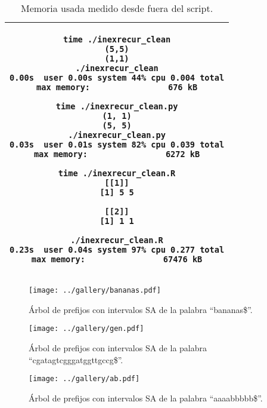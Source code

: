 \documentclass{article}
\newcommand{\tempcaption}{}
\newenvironment{codesnip}[1]
{
\begin{table}[h!]
\gdef\tempcaption{#1}
\centering
\begin{tabular}{|c|}
\hline
}
{
\\\hline
\end{tabular}
\caption{\tempcaption}
\end{table}
}
\begin{document}
\vfill
\begin{codesnip}{Memoria usada medido desde fuera del script.}
\begin{lstlisting}
time ./inexrecur_clean
(5,5)
(1,1)
./inexrecur_clean
0.00s  user 0.00s system 44% cpu 0.004 total
max memory:                676 kB

time ./inexrecur_clean.py
(1, 1)
(5, 5)
./inexrecur_clean.py
0.03s  user 0.01s system 82% cpu 0.039 total
max memory:                6272 kB

time ./inexrecur_clean.R
[[1]]
[1] 5 5

[[2]]
[1] 1 1

./inexrecur_clean.R
0.23s  user 0.04s system 97% cpu 0.277 total
max memory:                67476 kB
\end{lstlisting}
\end{codesnip}

\begin{figure}[h]
\centering
\texttt{[image: ../gallery/bananas.pdf]}
\caption{Árbol de prefijos con intervalos SA de la palabra ``bananas\$''.}
\end{figure}

\begin{figure}[h]
\centering
\texttt{[image: ../gallery/gen.pdf]}
\caption{Árbol de prefijos con intervalos SA de la palabra ``cgatagtcgggatggttgccg\$''.}
\end{figure}

\begin{figure}[h]
\centering
\texttt{[image: ../gallery/ab.pdf]}
\caption{Árbol de prefijos con intervalos SA de la palabra ``aaaabbbbb\$''.}
\end{figure}
\end{document}
